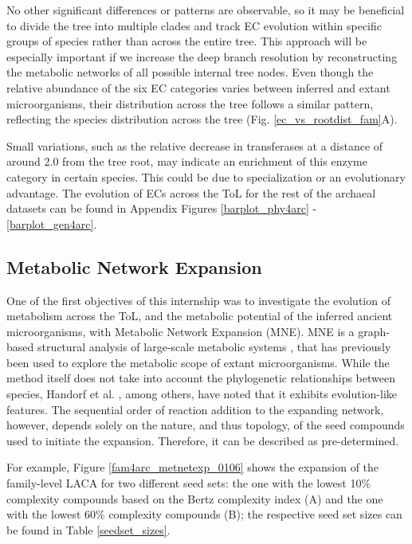 No other significant differences or patterns are observable, so it may be beneficial to divide the tree into multiple clades and track EC evolution within specific groups of species rather than across the entire tree. This approach will be especially important if we increase the deep branch resolution by reconstructing the metabolic networks of all possible internal tree nodes. Even though the relative abundance of the six EC categories varies between inferred and extant microorganisms, their distribution across the tree follows a similar pattern, reflecting the species distribution across the tree (Fig. \ref{ec_vs_rootdist_fam}A). 

Small variations, such as the relative decrease in transferases at a distance of around 2.0 from the tree root, may indicate an enrichment of this enzyme category in certain species. This could be due to specialization or an evolutionary advantage. The evolution of ECs across the ToL for the rest of the archaeal datasets can be found in Appendix Figures \ref{barplot_phy4arc} - \ref{barplot_gen4arc}.



\subsection*{Metabolic Network Expansion}

One of the first objectives of this internship was to investigate the evolution of metabolism across the ToL, and the metabolic potential of the inferred ancient microorganisms, with Metabolic Network Expansion (MNE). MNE is a graph-based structural analysis of large-scale metabolic systems \cite{ebenhoh2004}, that has previously been used to explore the metabolic scope of extant microorganisms. While the method itself does not take into account the phylogenetic relationships between species, Handorf et al. \cite{handorf2005}, among others, have noted that it exhibits evolution-like features. The sequential order of reaction addition to the expanding network, however, depends solely on the nature, and thus topology, of the seed compounds used to initiate the expansion. Therefore, it can be described as pre-determined.

For example, Figure \ref{fam4arc_metnetexp_0106} shows the expansion of the family-level LACA for two different seed sets: the one with the lowest 10\% complexity compounds based on the Bertz complexity index (A) and the one with the lowest 60\% complexity compounds (B); the respective seed set sizes can be found in Table \ref{seedset_sizes}.

